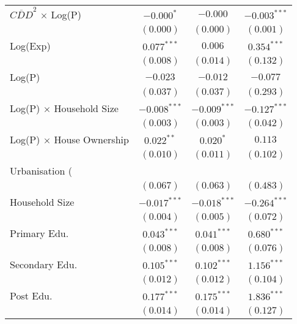 \begin{table}[H]
\begin{center}
\begin{tabular}{l c c c}
$\overline{CDD}^2$ $\times$ Log(P)   & $-0.000^{*}$   & $-0.000$       & $-0.003^{***}$   \\
                                     & $(0.000)$      & $(0.000)$      & $(0.001)$        \\
Log(Exp)                             & $0.077^{***}$  & $0.006$        & $0.354^{***}$    \\
                                     & $(0.008)$      & $(0.014)$      & $(0.132)$        \\
Log(P)                               & $-0.023$       & $-0.012$       & $-0.077$         \\
                                     & $(0.037)$      & $(0.037)$      & $(0.293)$        \\
Log(P) $\times$ Household Size       & $-0.008^{***}$ & $-0.009^{***}$ & $-0.127^{***}$   \\
                                     & $(0.003)$      & $(0.003)$      & $(0.042)$        \\
Log(P) $\times$ House Ownership      & $0.022^{**}$   & $0.020^{*}$    & $0.113$          \\
                                     & $(0.010)$      & $(0.011)$      & $(0.102)$        \\
Urbanisation (\\%
                                     & $(0.067)$      & $(0.063)$      & $(0.483)$        \\
Household Size                       & $-0.017^{***}$ & $-0.018^{***}$ & $-0.264^{***}$   \\
                                     & $(0.004)$      & $(0.005)$      & $(0.072)$        \\
Primary Edu.                         & $0.043^{***}$  & $0.041^{***}$  & $0.680^{***}$    \\
                                     & $(0.008)$      & $(0.008)$      & $(0.076)$        \\
Secondary Edu.                       & $0.105^{***}$  & $0.102^{***}$  & $1.156^{***}$    \\
                                     & $(0.012)$      & $(0.012)$      & $(0.104)$        \\
Post Edu.                            & $0.177^{***}$  & $0.175^{***}$  & $1.836^{***}$    \\
                                     & $(0.014)$      & $(0.014)$      & $(0.127)$        \\

\end{tabular}
\end{center}
\end{table}
